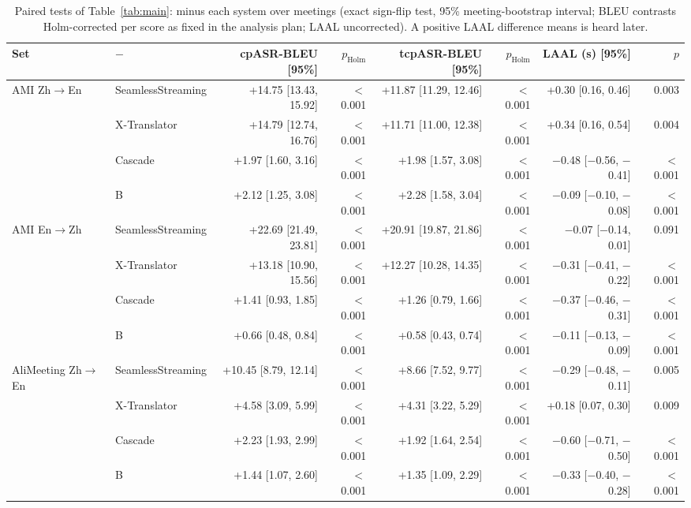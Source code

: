 \begin{table}[t]
\centering\small
\setlength{\tabcolsep}{3pt}
\begin{tabular}{llrrrrrr}
\toprule
Set & \sys{} $-$ & cpASR-BLEU [95\%] & $p_\text{Holm}$ & tcpASR-BLEU [95\%] & $p_\text{Holm}$ & LAAL (s) [95\%] & $p$ \\
\midrule
AMI Zh$\rightarrow$En & SeamlessStreaming & +14.75 [13.43, 15.92] & $<$0.001 & +11.87 [11.29, 12.46] & $<$0.001 & +0.30 [0.16, 0.46] & 0.003 \\
 & X-Translator & +14.79 [12.74, 16.76] & $<$0.001 & +11.71 [11.00, 12.38] & $<$0.001 & +0.34 [0.16, 0.54] & 0.004 \\
 & Cascade & +1.97 [1.60, 3.16] & $<$0.001 & +1.98 [1.57, 3.08] & $<$0.001 & $-$0.48 [$-$0.56, $-$0.41] & $<$0.001 \\
 & B & +2.12 [1.25, 3.08] & $<$0.001 & +2.28 [1.58, 3.04] & $<$0.001 & $-$0.09 [$-$0.10, $-$0.08] & $<$0.001 \\
\midrule
AMI En$\rightarrow$Zh & SeamlessStreaming & +22.69 [21.49, 23.81] & $<$0.001 & +20.91 [19.87, 21.86] & $<$0.001 & $-$0.07 [$-$0.14, 0.01] & 0.091 \\
 & X-Translator & +13.18 [10.90, 15.56] & $<$0.001 & +12.27 [10.28, 14.35] & $<$0.001 & $-$0.31 [$-$0.41, $-$0.22] & $<$0.001 \\
 & Cascade & +1.41 [0.93, 1.85] & $<$0.001 & +1.26 [0.79, 1.66] & $<$0.001 & $-$0.37 [$-$0.46, $-$0.31] & $<$0.001 \\
 & B & +0.66 [0.48, 0.84] & $<$0.001 & +0.58 [0.43, 0.74] & $<$0.001 & $-$0.11 [$-$0.13, $-$0.09] & $<$0.001 \\
\midrule
AliMeeting Zh$\rightarrow$En & SeamlessStreaming & +10.45 [8.79, 12.14] & $<$0.001 & +8.66 [7.52, 9.77] & $<$0.001 & $-$0.29 [$-$0.48, $-$0.11] & 0.005 \\
 & X-Translator & +4.58 [3.09, 5.99] & $<$0.001 & +4.31 [3.22, 5.29] & $<$0.001 & +0.18 [0.07, 0.30] & 0.009 \\
 & Cascade & +2.23 [1.93, 2.99] & $<$0.001 & +1.92 [1.64, 2.54] & $<$0.001 & $-$0.60 [$-$0.71, $-$0.50] & $<$0.001 \\
 & B & +1.44 [1.07, 2.60] & $<$0.001 & +1.35 [1.09, 2.29] & $<$0.001 & $-$0.33 [$-$0.40, $-$0.28] & $<$0.001 \\
\bottomrule
\end{tabular}
\caption{Paired tests of Table~\ref{tab:main}: \sys{} minus each system over meetings (exact sign-flip test, 95\% meeting-bootstrap interval; BLEU contrasts Holm-corrected per score as fixed in the analysis plan; LAAL uncorrected). A positive LAAL difference means \sys{} is heard later.}
\label{tab:syssig}
\end{table}
